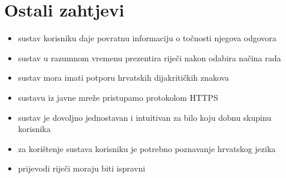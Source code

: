 \eject

\section{Ostali zahtjevi}

\begin{itemize}
\item sustav korisniku daje povratnu informaciju o točnosti njegova odgovora
\item sustav u razumnom vremenu prezentira riječi nakon odabira načina rada
\item sustav mora imati potporu hrvatskih dijakritičkih znakova
\item sustavu iz javne mreže pristupamo protokolom HTTPS
\item sustav je dovoljno jednostavan i intuitivan za bilo koju dobnu skupinu korisnika 
\item za korištenje sustava korisniku je potrebno poznavanje hrvatskog jezika
\item prijevodi riječi moraju biti ispravni
\end{itemize}
